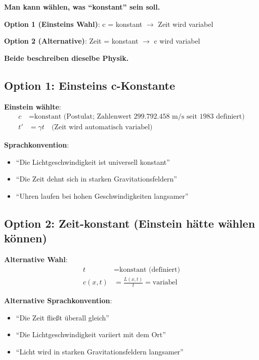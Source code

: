	\begin{tcolorbox}[colback=orange!5!white,colframe=orange!75!black,title=Die fundamentale Wahlmöglichkeit]
		\textbf{Man kann wählen, was ``konstant'' sein soll.}
		
		\textbf{Option 1 (Einsteins Wahl)}: c = konstant $\rightarrow$ Zeit wird variabel
		
		\textbf{Option 2 (Alternative)}: Zeit = konstant $\rightarrow$ c wird variabel
		
		\textbf{Beide beschreiben dieselbe Physik.}
	\end{tcolorbox}
	
	\subsection{Option 1: Einsteins c-Konstante}
	
	\textbf{Einstein wählte}:
	\begin{align}
		c &= \text{konstant (Postulat; Zahlenwert 299.792.458 m/s seit 1983 definiert)} \\
		t' &= \gamma t \quad \text{(Zeit wird automatisch variabel)}
	\end{align}
	
	\textbf{Sprachkonvention}:
	\begin{itemize}
		\item ``Die Lichtgeschwindigkeit ist universell konstant''
		\item ``Die Zeit dehnt sich in starken Gravitationsfeldern''
		\item ``Uhren laufen bei hohen Geschwindigkeiten langsamer''
	\end{itemize}
	
	\subsection{Option 2: Zeit-konstant (Einstein hätte wählen können)}
	
	\textbf{Alternative Wahl}:
	\begin{align}
		t &= \text{konstant (definiert)} \\
		c(x,t) &= \frac{L(x,t)}{t} = \text{variabel}
	\end{align}
	
	\textbf{Alternative Sprachkonvention}:
	\begin{itemize}
		\item ``Die Zeit fließt überall gleich''
		\item ``Die Lichtgeschwindigkeit variiert mit dem Ort''
		\item ``Licht wird in starken Gravitationsfeldern langsamer''
	\end{itemize}
	
